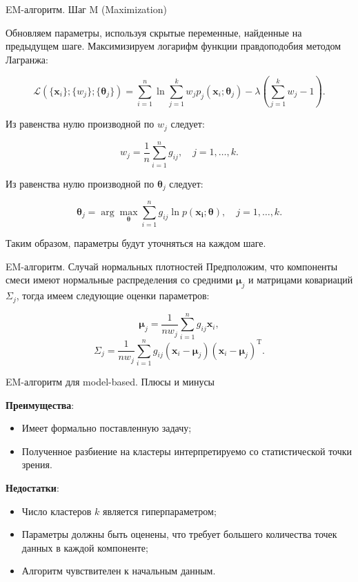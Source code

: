 \documentclass[unicode, notheorems, handout]{beamer}
\begin{document}
\begin{frame}{EM-алгоритм. Шаг M (Maximization)}

Обновляем параметры, используя скрытые переменные, найденные на предыдущем шаге. Максимизируем логарифм функции правдоподобия методом Лагранжа:
\vspace{-3ex}

$$\mathcal{L}(\{\pmb{x}_i\}; \{w_j\}; \{\pmb{\theta}_j\}) = \sum_{i=1}^n \ln \sum_{j=1}^k w_j p_j(\pmb{x}_i; \pmb{\theta}_j) -\lambda(\sum_{j=1}^k w_j - 1). $$

Из равенства нулю производной по $w_j$ следует:

$$w_j = \frac{1}{n} \sum_{i=1}^n g_{ij}, \quad j=1, \dots, k.$$

Из равенства нулю производной по $\pmb{\theta}_j$ следует:

$$\pmb{\theta}_j = \arg \max_{\pmb{\theta}} \sum_{i=1}^n g_{ij} \ln p(\pmb{x_i}; \pmb{\theta}), \quad j=1, \dots, k.$$

Таким образом, параметры будут уточняться на каждом шаге.
\end{frame}

\begin{frame}{EM-алгоритм. Случай нормальных плотностей}
Предположим, что компоненты смеси имеют нормальные распределения со средними $\pmb{\mu}_j$ и матрицами ковариаций $\Sigma_j$, тогда имеем следующие оценки параметров:

$$\pmb{\mu}_j = \frac{1}{nw_j} \sum_{i=1}^n g_{ij} \pmb{x}_i,$$
$$\Sigma_j = \frac{1}{nw_j} \sum_{i=1}^n g_{ij} (\pmb{x}_i - \pmb{\mu}_j) (\pmb{x}_i - \pmb{\mu}_j)^{\mathrm{T}}.$$
\end{frame}

\begin{frame}{EM-алгоритм для model-based. Плюсы и минусы}

\textbf{Преимущества}:
\begin{itemize}
    \item Имеет формально поставленную задачу;
    \item Полученное разбиение на кластеры интерпретируемо со статистической точки зрения.
\end{itemize}
\vspace{1ex}

\textbf{Недостатки}:
\begin{itemize}
    \item Число кластеров $k$ является гиперпараметром;
    \item Параметры должны быть оценены, что требует большего количества точек данных в каждой компоненте;
    \item Алгоритм чувствителен к начальным данным. 
\end{itemize}
\end{frame}
\end{document}

